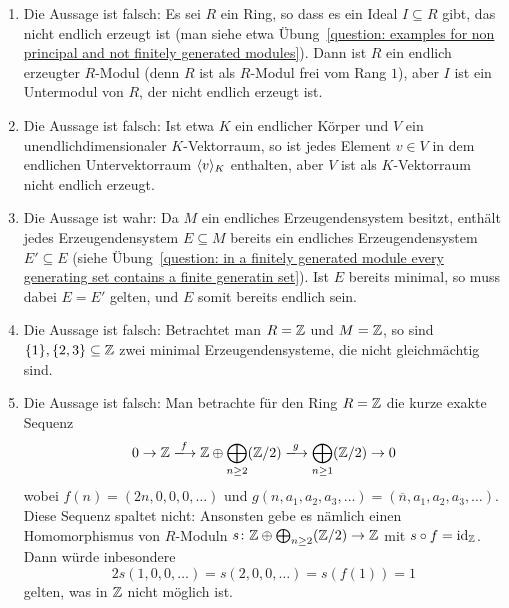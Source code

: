 \begin{solution}
\begin{enumerate}
    \item
      Die Aussage ist falsch:
      Es sei $R$ ein Ring, so dass es ein Ideal $I \subseteq R$ gibt, das nicht endlich erzeugt ist (man siehe etwa Übung~\ref{question: examples for non principal and not finitely generated modules}).
      Dann ist $R$ ein endlich erzeugter $R$-Modul (denn $R$ ist als $R$-Modul frei vom Rang $1$), aber $I$ ist ein Untermodul von $R$, der nicht endlich erzeugt ist.
      
    \item
      Die Aussage ist falsch:
      Ist etwa $K$ ein endlicher Körper und $V$ ein unendlichdimensionaler $K$-Vektorraum, so ist jedes Element $v \in V$ in dem endlichen Untervektorraum $\langle v\rangle_K$ enthalten, aber $V$ ist als $K$-Vektorraum nicht endlich erzeugt.
      
    \item
      Die Aussage ist wahr:
      Da $M$ ein endliches Erzeugendensystem besitzt, enthält jedes Erzeugendensystem $E \subseteq M$ bereits ein endliches Erzeugendensystem $E' \subseteq E$ (siehe Übung~\ref{question: in a finitely generated module every generating set contains a finite generatin set}).
      Ist $E$ bereits minimal, so muss dabei $E = E'$ gelten, und $E$ somit bereits endlich sein.
      
    \item
      Die Aussage ist falsch:
      Betrachtet man $R = \mathbb{Z}$ und $M = \mathbb{Z}$, so sind $\{1\}, \{2, 3\} \subseteq \mathbb{Z}$ zwei minimal Erzeugendensysteme, die nicht gleichmächtig sind.
      
    \item
      Die Aussage ist falsch:
      Man betrachte für den Ring $R = \mathbb{Z}$ die kurze exakte Sequenz
      \[
                            0
        \to                 \Integer
        \xlongrightarrow{f} \Integer \oplus \bigoplus_{n \geq 2} (\Integer/2)
        \xlongrightarrow{g} \bigoplus_{n \geq 1} (\Integer/2)
        \to                 0
      \]
      wobei $f(n) = (2n,0,0,0,\dotsc)$ und $g(n, a_1, a_2, a_3, \dotsc) = (\overline{n}, a_1, a_2, a_3, \dotsc)$.
      Diese Sequenz spaltet nicht:
      Ansonsten gebe es nämlich einen Homomorphismus von $R$-Moduln $s \colon \mathbb{Z} \oplus \bigoplus_{n \geq 2} (\mathbb{Z}/2) \to \mathbb{Z}$ mit $s \circ f = \operatorname{id}_{\mathbb{Z}}$.
      Dann würde inbesondere
      \[
          2 s(1,0,0,\dotsc)
        = s(2,0,0,\dotsc)
        = s(f(1))
        = 1
      \]
      gelten, was in $\mathbb{Z}$ nicht möglich ist.
      

\end{enumerate}
\end{solution}
